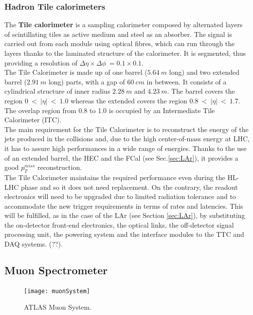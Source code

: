 \documentclass[a4paper,12pt]{article}
\begin{document}
\subsubsection{Hadron Tile calorimeters}
The \textbf{Tile calorimeter} is a sampling calorimeter composed by alternated layers of scintillating tiles as active medium and steel as an absorber. The signal is carried out from each module using optical fibres, which can run through the layers thanks to the laminated structure of the calorimeter. It is segmented, thus providing a resolution of
$\Delta\eta \times \Delta\phi\ = 0.1 \times 0.1$.\\
The Tile Calorimeter is made up of one barrel ($5.64\ m$ long) and two extended barrel ($2.91\ m$ long) parts, with a gap of $60\ cm$ in between. It consists of a cylindrical structure of inner radius $2.28\ m$ and $4.23\ m$. The barrel covers the region $0\ <\ |\eta|\ <\ 1.0$ whereas the extended covers the region $0.8\ <\ |\eta|\ <\ 1.7$. The overlap region from 0.8 to 1.0 is
occupied by an Intermediate Tile Calorimeter (ITC).\\
The main requirement for the Tile Calorimeter is to reconstruct the energy of the jets produced in the collisions and, due to the high center-of-mass energy at LHC, it has to assure 
high performances in a wide range of energies. Thanks to the use of an extended barrel, the HEC and the FCal (see Sec.\ref{sec:LAr}), it provides a good $p_T^{miss}$ reconstruction.\\[2pt]

The Tile Calorimeter maintains the required performance even during the HL-LHC phase and
so it does not need replacement. On the contrary, the readout electronics will need to be upgraded due to limited radiation tolerance and to accommodate the new trigger requirements in terms of rates and latencies. This will be fulfilled, as in the case of the LAr (see
Section \ref{sec:LAr}), by substituting the on-detector front-end electronics, the optical links, the off-detector signal processing unit, the powering system and the interface modules to the TTC and DAQ systems. (??).

\subsection{Muon Spectrometer}\label{sec:muon}\cite{muon_tdr}\cite{Aad:2008zzm}

\begin{figure} [h]
	\centering
	\texttt{[image: muonSystem]}
	\caption{ATLAS Muon System\cite{muon_tdr}.}
	\label{fig:muonSystem}
\end{figure}
\end{document}
